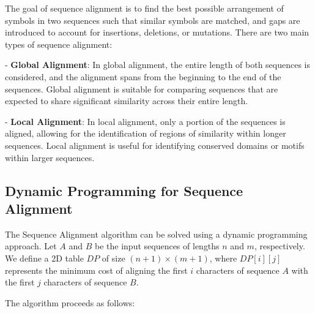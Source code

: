 \documentclass[12pt]{book} %
\begin{document}
The goal of sequence alignment is to find the best possible arrangement of symbols in two sequences such that similar symbols are matched, and gaps are introduced to account for insertions, deletions, or mutations. There are two main types of sequence alignment:

- \textbf{Global Alignment}: In global alignment, the entire length of both sequences is considered, and the alignment spans from the beginning to the end of the sequences. Global alignment is suitable for comparing sequences that are expected to share significant similarity across their entire length.

- \textbf{Local Alignment}: In local alignment, only a portion of the sequences is aligned, allowing for the identification of regions of similarity within longer sequences. Local alignment is useful for identifying conserved domains or motifs within larger sequences.


\subsection{Dynamic Programming for Sequence Alignment}
The Sequence Alignment algorithm can be solved using a dynamic programming approach. Let \( A \) and \( B \) be the input sequences of lengths \( n \) and \( m \), respectively. We define a 2D table \( DP \) of size \( (n+1) \times (m+1) \), where \( DP[i][j] \) represents the minimum cost of aligning the first \( i \) characters of sequence \( A \) with the first \( j \) characters of sequence \( B \).

The algorithm proceeds as follows:
\end{document}
